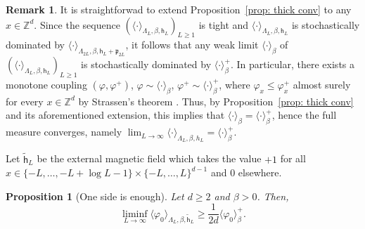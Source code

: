 \documentclass[11pt,a4paper]{article}
\newtheorem{proposition}[theorem]{Proposition}
\theoremstyle{definition}
\newtheorem{remark}[theorem]{Remark}
\numberwithin{equation}{section}
\begin{document}
\begin{remark}\label{rem: equality mag implies equality meas} It is straightforwad to extend Proposition~\textup{\ref{prop: thick conv}} to any $x \in \mathbb Z^d$. Since the sequence $(\langle \cdot \rangle_{\Lambda_L,\beta,\mathsf{h}_L})_{L\geq 1}$ is tight and $\langle \cdot \rangle_{\Lambda_L,\beta,\mathsf{h}_L}$ is stochastically dominated by $\langle \cdot \rangle_{\Lambda_{2L},\beta,\mathsf{h}_L+\mathfrak{p}_{2L}}$, it follows that any weak limit $\langle \cdot \rangle_{\beta}$ of $(\langle \cdot \rangle_{\Lambda_L,\beta,{\mathsf{h}_L}})_{L\geq 1}$ is stochastically dominated by $\langle \cdot \rangle^+_{\beta}$. In particular, there exists a monotone coupling $(\varphi,\varphi^+)$, $\varphi\sim \langle \cdot \rangle_{\beta}$, $\varphi^+\sim \langle \cdot \rangle^+_{\beta}$, where $\varphi_x\leq \varphi^+_x$ almost surely for every $x\in \mathbb{Z}^d$ by Strassen's theorem \textup{\cite{Strassen1965}}. Thus, by Proposition~\textup{\ref{prop: thick conv}} and its aforementioned extension, this implies that $\langle \cdot \rangle_{\beta}=\langle \cdot \rangle^+_{\beta}$, hence the full measure converges, namely $\lim_{L\rightarrow \infty} \langle \cdot \rangle_{\Lambda_L,\beta,h_L}=\langle \cdot \rangle^+_\beta$. 
\end{remark}

Let $\tilde{\mathsf{h}}_L$ be the external magnetic field which takes the value $+1$ for all $x\in \{-L,\ldots,-L+\log L-1\}\times \{-L,\ldots,L\}^{d-1}$ and $0$ elsewhere.
\begin{proposition}[One side is enough]\label{prop: one side is enough}
Let $d\geq 2$ and $\beta>0$. Then,
 \begin{equation}
     \liminf_{L\rightarrow\infty}\langle \varphi_0\rangle_{\Lambda_L,\beta,\tilde{\mathsf{h}}_L}\geq \frac{1}{2d}\langle \varphi_0\rangle^+_{\beta}.
 \end{equation}
\end{proposition}
\end{document}
